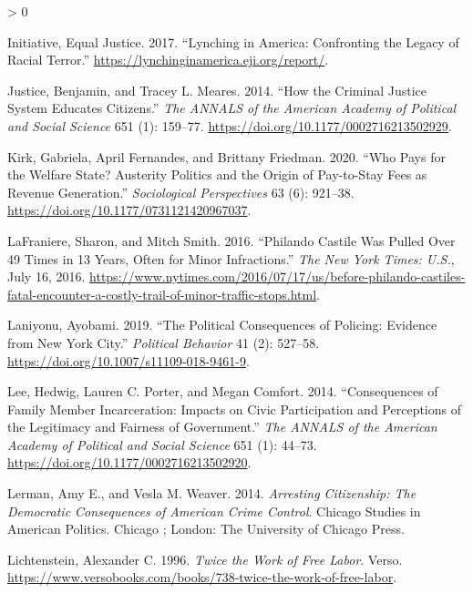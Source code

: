 \documentclass[
  12pt,
]{article}
\newlength{\cslhangindent}
\newenvironment{CSLReferences}[2] %
 {%
  \setlength{\parindent}{0pt}
  \ifodd #1 \everypar{\setlength{\hangindent}{\cslhangindent}}\ignorespaces\fi
  \ifnum #2 > 0
  \setlength{\parskip}{#2\baselineskip}
  \fi
 }%
 {}
\begin{document}
\begin{CSLReferences}{1}{0}
\leavevmode\hypertarget{ref-EqualJusticeInitiative2017}{}%
Initiative, Equal Justice. 2017. {``Lynching in {America}: {Confronting} the {Legacy} of {Racial Terror}.''} \url{https://lynchinginamerica.eji.org/report/}.

\leavevmode\hypertarget{ref-Justice2014}{}%
Justice, Benjamin, and Tracey L. Meares. 2014. {``How the {Criminal Justice System Educates Citizens}.''} \emph{The ANNALS of the American Academy of Political and Social Science} 651 (1): 159--77. \url{https://doi.org/10.1177/0002716213502929}.

\leavevmode\hypertarget{ref-Kirk2020}{}%
Kirk, Gabriela, April Fernandes, and Brittany Friedman. 2020. {``Who {Pays} for the {Welfare State}? {Austerity Politics} and the {Origin} of {Pay}-to-{Stay Fees} as {Revenue Generation}.''} \emph{Sociological Perspectives} 63 (6): 921--38. \url{https://doi.org/10.1177/0731121420967037}.

\leavevmode\hypertarget{ref-LaFraniere2016}{}%
LaFraniere, Sharon, and Mitch Smith. 2016. {``Philando {Castile Was Pulled Over} 49 {Times} in 13 {Years}, {Often} for {Minor Infractions}.''} \emph{The New York Times: U.S.}, July 16, 2016. \url{https://www.nytimes.com/2016/07/17/us/before-philando-castiles-fatal-encounter-a-costly-trail-of-minor-traffic-stops.html}.

\leavevmode\hypertarget{ref-Laniyonu2019}{}%
Laniyonu, Ayobami. 2019. {``The {Political Consequences} of {Policing}: {Evidence} from {New York City}.''} \emph{Political Behavior} 41 (2): 527--58. \url{https://doi.org/10.1007/s11109-018-9461-9}.

\leavevmode\hypertarget{ref-Lee2014}{}%
Lee, Hedwig, Lauren C. Porter, and Megan Comfort. 2014. {``Consequences of {Family Member Incarceration}: {Impacts} on {Civic Participation} and {Perceptions} of the {Legitimacy} and {Fairness} of {Government}.''} \emph{The ANNALS of the American Academy of Political and Social Science} 651 (1): 44--73. \url{https://doi.org/10.1177/0002716213502920}.

\leavevmode\hypertarget{ref-Lerman2014}{}%
Lerman, Amy E., and Vesla M. Weaver. 2014. \emph{Arresting Citizenship: The Democratic Consequences of {American} Crime Control}. Chicago Studies in {American} Politics. {Chicago ; London}: {The University of Chicago Press}.

\leavevmode\hypertarget{ref-Lichtenstein1996}{}%
Lichtenstein, Alexander C. 1996. \emph{Twice the {Work} of {Free Labor}}. {Verso}. \url{https://www.versobooks.com/books/738-twice-the-work-of-free-labor}.


\end{CSLReferences}
\end{document}
